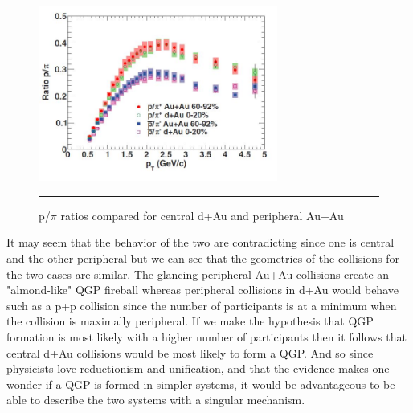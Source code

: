 \begin{figure}[htbp!]
  \centering
    \includegraphics[width=0.7\textwidth]{prevplots/dAvsAAratios.JPG}
    \rule{35em}{0.5pt}
  \caption[p/$\pi$ ratios compared for central d+Au and peripheral Au+Au]{p/$\pi$ ratios compared for central d+Au and peripheral Au+Au\citep{PhysRevC.88.024906}}
  \label{fig:daaaratios}
\end{figure} 

It may seem that the behavior of the two are contradicting since one is central and the other peripheral but we can see that the geometries of the collisions for the two cases are similar. The glancing peripheral Au+Au collisions create an "almond-like" QGP fireball whereas peripheral collisions in d+Au would behave such as a p+p collision since the number of participants is at a minimum when the collision is maximally peripheral. If we make the hypothesis that QGP formation is most likely with a higher number of participants then it follows that central d+Au collisions would be most likely to form a QGP. And so since physicists love reductionism and unification, and that the evidence makes one wonder if a QGP is formed in simpler systems, it would be advantageous to be able to describe the two systems with a singular mechanism.

